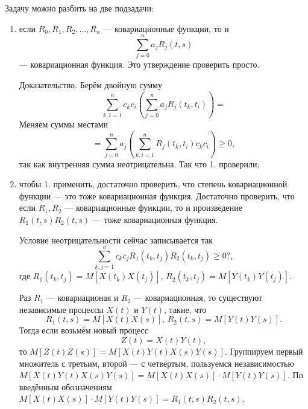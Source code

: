 Задачу можно разбить на две подзадачи:
\begin{enumerate}
  \item если $R_0, R_1, R_2, \dotsc, R_n$ --- ковариационные функции, то и
  $$ \sum \limits_{j = 0}^n a_j R_j \left( t, s \right) $$
  --- ковариационная функция.
  Это утверждение проверить просто.

  Доказательство.
  Берём двойную сумму
  $$ \sum \limits_{k, i = 1}^n
    c_k c_i \left( \sum \limits_{j = 0}^n a_j R_j \left( t_k, t_i \right) \right) =$$
  Меняем суммы местами
  $$= \sum \limits_{j = 0}^n
    a_j \left( \sum \limits_{k, i = 1}^n R_j \left( t_k, t_i \right) c_k c_i \right) \geq 0,$$
  так как внутренняя сумма неотрицательна.
  Так что 1. проверили;
  \item чтобы 1. применить, достаточно проверить, что степень ковариационной функции ---
  это тоже ковариационная функция.
  Достаточно проверить, что если $R_1, R_2$ --- ковариационные функции,
  то и произведение $R_1 \left( t, s \right) R_2 \left( t, s \right) $ ---
  тоже ковариационная функция.

  Условие неотрицательности сейчас записывается так
  $$ \sum \limits_{k, j = 1}^n c_k c_j R_1 \left( t_k, t_j \right) R_2 \left( t_k, t_j \right) \geq
    0?,$$
  где
  $R_1 \left( t_k, t_j \right) = M \left[ X \left( t_k \right) X \left( t_j \right) \right], \,
    R_2 \left( t_k, t_j \right) = M \left[ Y \left( t_k \right) Y \left( t_j \right) \right] $.

  Раз $R_1$ --- ковариационая и $R_2$ --- ковариационная,
  то существуют независимые процессы $X \left( t \right) $ и $Y \left( t \right) $, такие, что
  $$R_1 \left( t, s \right) = M \left[ X \left( t \right) X \left( s \right) \right], \,
    R_2 \left( t, s \right) = M \left[ Y \left( t \right) Y \left( s \right) \right].$$
  Тогда если возьмём новый процесс
  $$Z \left( t \right) = X \left( t \right) Y \left( t \right),$$
  то
  $M \left[ Z \left( t \right) Z \left( s \right) \right] =
    M \left[ X \left( t \right) Y \left( t \right) X \left( s \right) Y \left( s \right) \right] $.
  Группируем первый множитель с третьим, второй --- с четвёртым, пользуемся независимостью
  $M \left[ X \left( t \right) Y \left( t \right) X \left( s \right) Y \left( s \right) \right] =
    M \left[ X \left( t \right) X \left( s \right) \right] \cdot
    M \left[ Y \left( t \right) Y \left( s \right) \right].$
  По введённым обозначениям
  $M \left[ X \left( t \right) X \left( s \right) \right] \cdot
    M \left[ Y \left( t \right) Y \left( s \right) \right] =
    R_1 \left( t, s \right) R_2 \left( t, s \right) $.
\end{enumerate}


